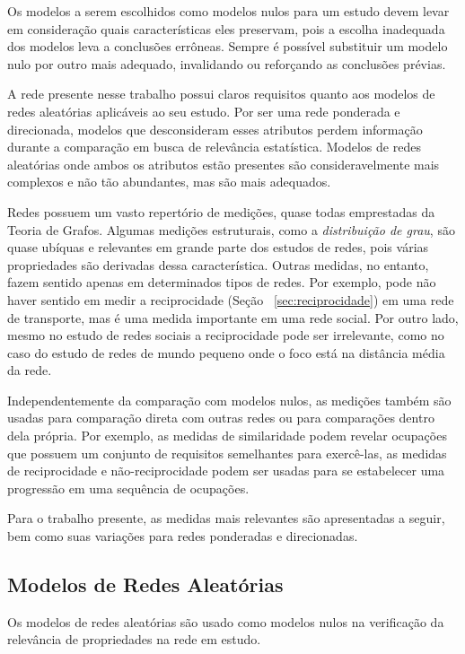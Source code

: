 \documentclass[12pt,a4paper,final]{article}
\begin{document}
Os modelos a serem escolhidos como modelos nulos para um estudo devem levar em consideração quais características eles preservam, pois a escolha inadequada dos modelos leva a conclusões errôneas. Sempre é possível substituir um modelo nulo por outro mais adequado, invalidando ou reforçando as conclusões prévias.

A rede presente nesse trabalho possui claros requisitos quanto aos modelos de redes aleatórias aplicáveis ao seu estudo. Por ser uma rede ponderada e direcionada, modelos que desconsideram esses atributos perdem informação durante a comparação em busca de relevância estatística. Modelos de redes aleatórias onde ambos os atributos estão presentes são consideravelmente mais complexos e não tão abundantes, mas são mais adequados.

Redes possuem um vasto repertório de medições, quase todas emprestadas da Teoria de Grafos. Algumas medições estruturais, como a \textit{distribuição de grau}, são quase ubíquas e relevantes em grande parte dos estudos de redes, pois várias propriedades são derivadas dessa característica. Outras medidas, no entanto, fazem sentido apenas em determinados tipos de redes. Por exemplo, pode não haver sentido em medir a reciprocidade (Seção ~\ref{sec:reciprocidade}) em uma rede de transporte, mas é uma medida importante em uma rede social. Por outro lado, mesmo no estudo de redes sociais a reciprocidade pode ser irrelevante, como no caso do estudo de redes de mundo pequeno onde o foco está na distância média da rede.

Independentemente da comparação com modelos nulos, as medições também são usadas para comparação direta com outras redes ou para comparações dentro dela própria. Por exemplo, as medidas de similaridade podem revelar ocupações que possuem um conjunto de requisitos semelhantes para exercê-las, as medidas de reciprocidade e não-reciprocidade podem ser usadas para se estabelecer uma progressão em uma sequência de ocupações.

Para o trabalho presente, as medidas mais relevantes são apresentadas a seguir, bem como suas variações para redes ponderadas e direcionadas.

\subsection{Modelos de Redes Aleatórias}

Os modelos de redes aleatórias são usado como modelos nulos na verificação da relevância de propriedades na rede em estudo.
\end{document}
